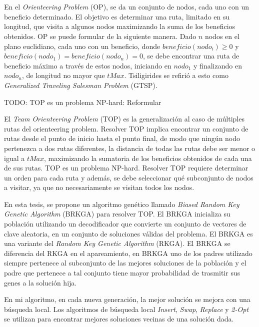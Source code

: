 
\chapter*{\tituloAbstractEs}

\noindent En el \textit{Orienteering Problem} (OP), se da un conjunto de nodos, cada uno con un beneficio determinado. El objetivo es determinar una ruta, limitado en su longitud, que visita a algunos nodos maximizando la suma de los beneficios obtenidos. OP se puede formular de la siguiente manera. Dado $n$ nodos en el plano euclidiano, cada uno con un beneficio, donde $beneficio(nodo_i) \geq 0$ y $beneficio(nodo_1) = beneficio(nodo_n) = 0$, se debe encontrar una ruta de beneficio máximo a través de estos nodos, iniciando en $nodo_1$ y finalizando en $nodo_n$, de longitud no mayor que $tMax$. Tsiligirides \cite{Tsiligirides} se refirió a esto como \textit{Generalized Traveling Salesman Problem} (GTSP).

\bigskip

TODO:  TOP es un problema NP-hard: Reformular

El \textit{Team Orienteering Problem} (TOP) es la generalización al caso de múltiples rutas del orienteering problem. Resolver TOP implica encontrar un conjunto de rutas desde el punto de inicio hasta el punto final, de modo que ningún nodo pertenezca a dos rutas diferentes, la distancia de todas las rutas debe ser menor o igual a $tMax$, maximizando la sumatoria de los beneficios obtenidos de cada una de sus rutas. TOP es un problema NP-hard. Resolver TOP requiere determinar un orden para cada ruta y además, se debe seleccionar qué subconjunto de nodos a visitar, ya que no necesariamente se visitan todos los nodos.

\bigskip

En esta tesis, se propone un algoritmo genético llamado \textit{Biased Random Key Genetic Algorithm} (BRKGA) para resolver TOP. El BRKGA inicializa su población utilizando un decodificador que convierte un conjunto de vectores de clave aleatoria, en un conjunto de soluciones válidas del problema. El BRKGA es una variante del \textit{Random Key Genetic Algorithm} (RKGA). El BRKGA se diferencia del RKGA en el apareamiento, en BRKGA uno de los padres utilizado siempre pertenece al subconjunto de las mejores soluciones de la población y el padre que pertenece a tal conjunto tiene mayor probabilidad de trasmitir sus genes a la solución hija.

\bigskip

En mi algoritmo, en cada nueva generación, la mejor solución se mejora con una búsqueda local. Los algoritmos de búsqueda local \textit{Insert}, \textit{Swap}, \textit{Replace} y \textit{2-Opt} se utilizan para encontrar mejores soluciones vecinas de una solución dada.

